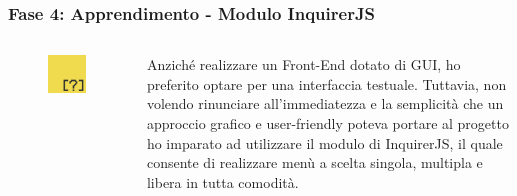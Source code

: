 \documentclass{beamer}
\begin{document}
\begin{frame}
	\frametitle{Fase 4: Apprendimento - Modulo InquirerJS}
	\begin{columns}
			\begin{figure}
				\includegraphics[width=1\textwidth]{figures/inquirer.png}
			\end{figure}
		Anziché realizzare un Front-End dotato di GUI, ho preferito optare per una interfaccia testuale. Tuttavia, non volendo rinunciare all’immediatezza e la semplicità che un approccio grafico e user-friendly poteva portare al progetto ho imparato ad utilizzare il modulo di InquirerJS, il quale consente di realizzare menù a scelta singola, multipla e libera in tutta comodità.
	\end{columns}
\end{frame}
\end{document}
